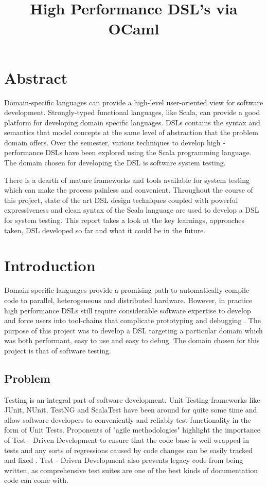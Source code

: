 \documentclass[12 pt]{article}
\title{High Performance DSL's via OCaml}
\begin{document}

\maketitle
\onehalfspacing

\vspace{-10 mm}
\tableofcontents

\newpage
\section{Abstract}
Domain-specific languages can provide a high-level user-oriented view for software development. Strongly-typed functional languages, like Scala, can provide a good platform for developing domain specific languages. DSLs contains the syntax and semantics that model concepts at the same level of abstraction that the problem domain offers. Over the semester, various techniques to develop high - performance DSLs have been explored using the Scala programming language. The domain chosen for developing the DSL is software system testing.
\bigskip

\noindent
There is a dearth of mature frameworks and tools available for system testing which can make the process painless and convenient. Throughout the course of this project, state of the art DSL design techniques coupled with powerful expressiveness and clean syntax of the Scala language are used to develop a DSL for system testing. This report takes a look at the key learnings, approaches taken, DSL developed so far and what it could be in the future.

\newpage
\section{Introduction}

\noindent
Domain specific languages provide a promising path to automatically compile code to parallel, heterogeneous and distributed hardware. However, in practice high performance DSLs still require considerable software expertise to develop and force users into tool-chains that complicate  prototyping and debugging \cite{delite}. The purpose of this project was to develop a DSL targeting a particular domain which was both performant, easy to use and easy to debug. The domain chosen for this project is that of software testing.

\subsection{Problem}
Testing is an integral part of software development. Unit Testing frameworks like JUnit, NUnit, TestNG and ScalaTest have been around for quite some time and allow software developers to conveniently and reliably test functionality in the form of Unit Tests. Proponents of "agile methodologies" highlight the importance of Test - Driven Development to ensure that the code base is well wrapped in tests and any sorts of regressions caused by code changes can be easily tracked and fixed \cite{tdd}. Test - Driven Development also prevents legacy code from being written, as comprehensive test suites are one of the best kinds of documentation code can come with.
\bigskip
\end{document}
